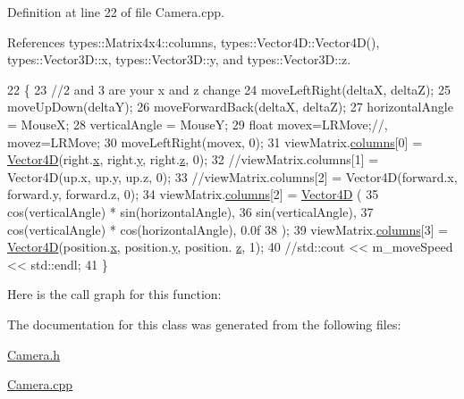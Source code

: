 Definition at line 22 of file Camera.\+cpp.



References types\+::\+Matrix4x4\+::columns, types\+::\+Vector4\+D\+::\+Vector4\+D(), types\+::\+Vector3\+D\+::x, types\+::\+Vector3\+D\+::y, and types\+::\+Vector3\+D\+::z.


\begin{DoxyCode}
22                                                                                                            
       \{
23     \textcolor{comment}{//2 and 3 are your x and z change}
24     moveLeftRight(deltaX, deltaZ);
25     moveUpDown(deltaY);
26     moveForwardBack(deltaX, deltaZ);
27     horizontalAngle = MouseX;
28     verticalAngle = MouseY;
29     \textcolor{keywordtype}{float} movex=LRMove;\textcolor{comment}{//, movez=LRMove;}
30     moveLeftRight(movex, 0);
31     viewMatrix.\hyperlink{structtypes_1_1_matrix4x4_a71eff2a403350446b93f8f11dda7b73e}{columns}[0] = \hyperlink{structtypes_1_1_vector4_d}{Vector4D}(right.\hyperlink{structtypes_1_1_vector3_d_a67f804e2d8b267b8196415f12a44b517}{x}, right.\hyperlink{structtypes_1_1_vector3_d_a02f330a5f3139f9cc3c5aead1728147c}{y}, right.\hyperlink{structtypes_1_1_vector3_d_a4266d5bca7826efcfb1fb6454affb51d}{z}, 0);
32     \textcolor{comment}{//viewMatrix.columns[1] = Vector4D(up.x, up.y, up.z, 0);}
33     \textcolor{comment}{//viewMatrix.columns[2] = Vector4D(forward.x, forward.y, forward.z, 0);}
34     viewMatrix.\hyperlink{structtypes_1_1_matrix4x4_a71eff2a403350446b93f8f11dda7b73e}{columns}[2] = \hyperlink{structtypes_1_1_vector4_d}{Vector4D} (
35     cos(verticalAngle) * sin(horizontalAngle),
36     sin(verticalAngle),
37     cos(verticalAngle) * cos(horizontalAngle), 0.0f
38 );
39     viewMatrix.\hyperlink{structtypes_1_1_matrix4x4_a71eff2a403350446b93f8f11dda7b73e}{columns}[3] = \hyperlink{structtypes_1_1_vector4_d}{Vector4D}(position.\hyperlink{structtypes_1_1_vector3_d_a67f804e2d8b267b8196415f12a44b517}{x}, position.\hyperlink{structtypes_1_1_vector3_d_a02f330a5f3139f9cc3c5aead1728147c}{y}, position.
      \hyperlink{structtypes_1_1_vector3_d_a4266d5bca7826efcfb1fb6454affb51d}{z}, 1);
40     \textcolor{comment}{//std::cout << m\_moveSpeed << std::endl;}
41 \}
\end{DoxyCode}


Here is the call graph for this function\+:




The documentation for this class was generated from the following files\+:\begin{DoxyCompactItemize}
\item 
\hyperlink{_camera_8h}{Camera.\+h}\item 
\hyperlink{_camera_8cpp}{Camera.\+cpp}\end{DoxyCompactItemize}
